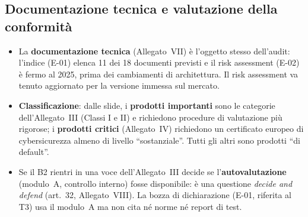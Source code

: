 \subsection{Documentazione tecnica e valutazione della conformità}
\begin{itemize}
  \item La \textbf{documentazione tecnica} (Allegato~VII) è l'oggetto stesso dell'audit: l'indice
    (E-01) elenca 11 dei 18 documenti previsti e il risk assessment (E-02) è fermo al 2025, prima
    dei cambiamenti di architettura. Il risk assessment va tenuto aggiornato per la versione immessa
    sul mercato.
  \item \textbf{Classificazione}: dalle slide, i \textbf{prodotti importanti} sono le categorie
    dell'Allegato~III (Classi I e II) e richiedono procedure di valutazione più rigorose; i
    \textbf{prodotti critici} (Allegato~IV) richiedono un certificato europeo di cybersicurezza almeno
    di livello ``sostanziale''. Tutti gli altri sono prodotti ``di default''.
  \item Se il B2 rientri in una voce dell'Allegato~III decide se l'\textbf{autovalutazione}
    (modulo~A, controllo interno) fosse disponibile: è una questione \emph{decide and defend}
    (art.~32, Allegato~VIII). La bozza di dichiarazione (E-01, riferita al T3) usa il modulo~A ma
    non cita né norme né report di test.
\end{itemize}

